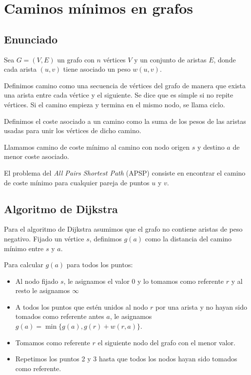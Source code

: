 \documentclass[a4paper, 11pt]{article} %
\begin{document}
\section{Caminos mínimos en grafos}
  \subsection{Enunciado}
    Sea $G=(V,E)$ un grafo con $n$ vértices $V$ y un conjunto de aristas $E$,
    donde cada arista $(u,v)$ tiene asociado un peso $w(u,v)$.
    
    Definimos camino como una secuencia de vértices del grafo de manera que exista una arista entre cada vértice y el siguiente. Se dice que es simple si no repite vértices. Si el camino empieza y termina en el mismo nodo, se llama ciclo.
    
    Definimos el coste asociado a un camino como la suma de los pesos de las aristas usadas para unir los vértices de dicho camino.
     
    Llamamos camino de coste mínimo al camino con nodo origen $s$ y destino $a$ de menor coste asociado.
    
    El problema del \textit{All Pairs Shortest Path} (APSP) consiste en encontrar el camino de coste mínimo para cualquier pareja de puntos $u$ y $v$.
  
  \subsection{Algoritmo de Dijkstra}
    Para el algoritmo de Dijkstra asumimos que el grafo no contiene aristas de peso negativo.
    Fijado un vértice $s$, definimos $g(a)$ como la distancia del camino mínimo entre $s$ y $a$.
    
    Para calcular $g(a)$ para todos los puntos:
    \begin{itemize}
      \item Al nodo fijado $s$, le asignamos el valor 0 y lo tomamos como referente $r$ y al resto le asignamos $\infty$
      \item A todos los puntos que estén unidos al nodo $r$  por una
      arista y no hayan sido tomados como referente antes $a$, le asignamos $g(a) = \min \{g(a), g(r) + w(r,a)\}$.
      \item Tomamos como referente $r$ el siguiente nodo del grafo con el menor valor.
      \item Repetimos los puntos 2 y 3 hasta que todos los nodos hayan sido tomados como referente.
    \end{itemize}
    
\end{document}
